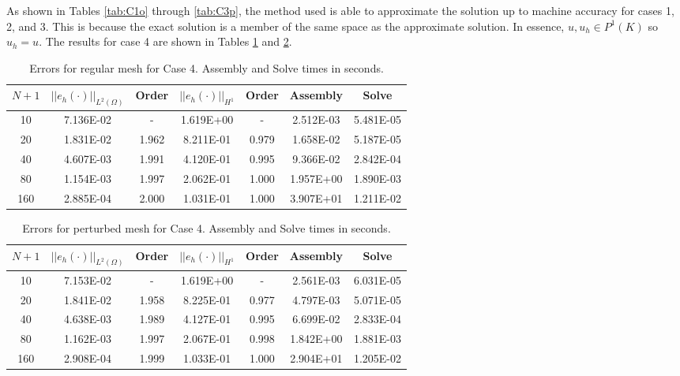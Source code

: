 \documentclass[a4paper, 12pt]{article}
\begin{document}
As shown in Tables \ref{tab:C1o} through \ref{tab:C3p}, 
the method used is able to approximate the solution
up to machine accuracy for cases 1, 2, and 3. 
This is because the exact solution is a member 
of the same space as the approximate solution.
In essence, $u, u_h \in P^1(K)$ so $u_h = u$.
The results for case 4 are shown in Tables \ref{tab:C4o}
and \ref{tab:C4p}. 

\begin{table}[!ht]
\caption{Errors for regular mesh for Case 4. Assembly and Solve times in seconds.}
\vspace{0.1in}
\centering
\begin{tabular}{|c|c|c|c|c|c|c|}
\hline
 $N+1$&  $||e_h(\cdot)||_{L^2(\Omega)}$ & Order & $||e_h(\cdot)||_{H^1}$ & Order & Assembly & Solve \\
 \hline
     10   & 7.136E-02 &  -      & 1.619E+00 &  -     & 2.512E-03 & 5.481E-05 \\
     20   & 1.831E-02 &  1.962  & 8.211E-01 &  0.979 & 1.658E-02 & 5.187E-05 \\
     40   & 4.607E-03 &  1.991  & 4.120E-01 &  0.995 & 9.366E-02 & 2.842E-04 \\
     80   & 1.154E-03 &  1.997  & 2.062E-01 &  1.000 & 1.957E+00 & 1.890E-03 \\
     160  & 2.885E-04 &  2.000  & 1.031E-01 &  1.000 & 3.907E+01 & 1.211E-02 \\
\hline
\end{tabular}
\label{tab:C4o}
\end{table}

\begin{table}[!ht]
\caption{Errors for perturbed mesh for Case 4. Assembly and Solve times in seconds.}
\vspace{0.1in}
\centering
\begin{tabular}{|c|c|c|c|c|c|c|}
\hline
 $N+1$&  $||e_h(\cdot)||_{L^2(\Omega)}$ & Order & $||e_h(\cdot)||_{H^1}$ & Order & Assembly & Solve \\
 \hline
     10   & 7.153E-02 & -     & 1.619E+00 &  -     & 2.561E-03 & 6.031E-05 \\
     20   & 1.841E-02 & 1.958 & 8.225E-01 &  0.977 & 4.797E-03 & 5.071E-05 \\
     40   & 4.638E-03 & 1.989 & 4.127E-01 &  0.995 & 6.699E-02 & 2.833E-04 \\
     80   & 1.162E-03 & 1.997 & 2.067E-01 &  0.998 & 1.842E+00 & 1.881E-03 \\
     160  & 2.908E-04 & 1.999 & 1.033E-01 &  1.000 & 2.904E+01 & 1.205E-02 \\
\hline
\end{tabular}
\label{tab:C4p}
\end{table}
\end{document}
